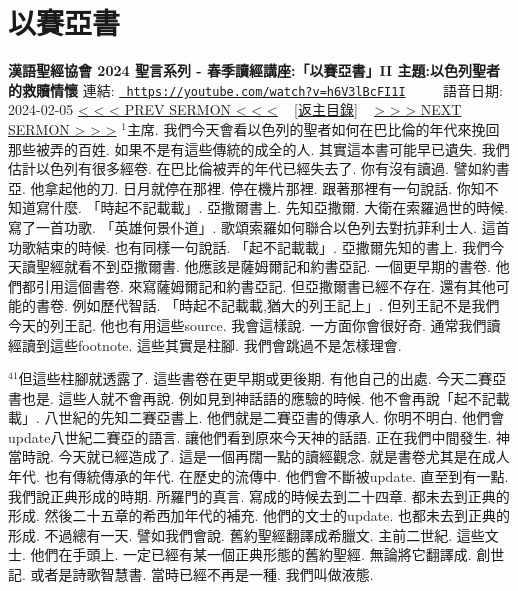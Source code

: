 \documentclass{book}
\begin{document}
\section{以賽亞書}
\label{sec:h6V3lBcFI1I}
\textbf{漢語聖經協會 2024 聖言系列 - 春季讀經講座:「以賽亞書」II 主題:以色列聖者的救贖情懷}
\newline
\newline
連結: \href{https://youtube.com/watch?v=h6V3lBcFI1I}{\texttt{ https://youtube.com/watch?v=h6V3lBcFI1I}} ~~~~ 語音日期: 2024-02-05 
\newline
\newline
\hyperref[sec:SrQmAQLb4ew]{\small{< < < PREV SERMON < < <}}
~
\hyperref[sec:index]{\small{[返主目錄]}}
~
\hyperref[sec:lB_bfqbs0xw]{\small{> > > NEXT SERMON > > >}}
\newline
\newline
$^{1}$主席.
我們今天會看以色列的聖者如何在巴比倫的年代來挽回那些被弄的百姓.
如果不是有這些傳統的成全的人.
其實這本書可能早已遺失.
我們估計以色列有很多經卷.
在巴比倫被弄的年代已經失去了.
你有沒有讀過.
譬如約書亞.
他拿起他的刀.
日月就停在那裡.
停在機片那裡.
跟著那裡有一句說話.
你知不知道寫什麼.
「時起不記載載」.
亞撒爾書上.
先知亞撒爾.
大衛在索羅過世的時候.
寫了一首功歌.
「英雄何景仆道」.
歌頌索羅如何聯合以色列去對抗菲利士人.
這首功歌結束的時候.
也有同樣一句說話.
「起不記載載」.
亞撒爾先知的書上.
我們今天讀聖經就看不到亞撒爾書.
他應該是薩姆爾記和約書亞記.
一個更早期的書卷.
他們都引用這個書卷.
來寫薩姆爾記和約書亞記.
但亞撒爾書已經不存在.
還有其他可能的書卷.
例如歷代智話.
「時起不記載載,猶大的列王記上」.
但列王記不是我們今天的列王記.
他也有用這些source.
我會這樣說.
一方面你會很好奇.
通常我們讀經讀到這些footnote.
這些其實是柱腳.
我們會跳過不是怎樣理會.

$^{41}$但這些柱腳就透露了.
這些書卷在更早期或更後期.
有他自己的出處.
今天二賽亞書也是.
這些人就不會再說.
例如見到神話語的應驗的時候.
他不會再說「起不記載載」.
八世紀的先知二賽亞書上.
他們就是二賽亞書的傳承人.
你明不明白.
他們會update八世紀二賽亞的語言.
讓他們看到原來今天神的話語.
正在我們中間發生.
神當時說.
今天就已經造成了.
這是一個再闊一點的讀經觀念.
就是書卷尤其是在成人年代.
也有傳統傳承的年代.
在歷史的流傳中.
他們會不斷被update.
直至到有一點.
我們說正典形成的時期.
所羅門的真言.
寫成的時候去到二十四章.
都未去到正典的形成.
然後二十五章的希西加年代的補充.
他們的文士的update.
也都未去到正典的形成.
不過總有一天.
譬如我們會說.
舊約聖經翻譯成希臘文.
主前二世紀.
這些文士.
他們在手頭上.
一定已經有某一個正典形態的舊約聖經.
無論將它翻譯成.
創世記.
或者是詩歌智慧書.
當時已經不再是一種.
我們叫做液態.
\end{document}

